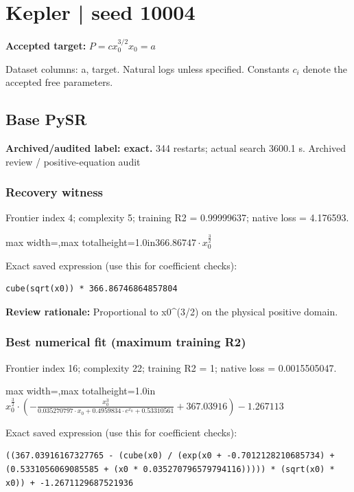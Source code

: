 \documentclass[10pt,letterpaper,landscape]{article}
\begin{document}
\section*{Kepler | seed 10004}
\textbf{Accepted target:} $\displaystyle P=c x_0^{3/2}$\hfill $x_0=a$\par
{\small Dataset columns: a, target. Natural logs unless specified. Constants $c_i$ denote the accepted free parameters.}\par\medskip
\begin{minipage}[t]{0.485\textwidth}
\subsection*{Base PySR}
\textbf{Archived/audited label: exact.} 344 restarts; actual search 3600.1 s.
{\small Archived review / positive-equation audit}
\subsubsection*{Recovery witness}
Frontier index 4; complexity 5; training R2 = 0.99999637; native loss = 4.176593.
\begin{center}\begin{adjustbox}{max width=\linewidth,max totalheight=1.0in}$\displaystyle 366.86747 \cdot x_{0}^{\frac{3}{2}}$\end{adjustbox}\end{center}
{\scriptsize Exact saved expression (use this for coefficient checks):}
\begin{lstlisting}
cube(sqrt(x0)) * 366.86746864857804
\end{lstlisting}
{\small\textbf{Review rationale:} Proportional to x0\textasciicircum{}(3/2) on the physical positive domain.}
\subsubsection*{Best numerical fit (maximum training R2)}
Frontier index 16; complexity 22; training R2 = 1; native loss = 0.0015505047.
\begin{center}\begin{adjustbox}{max width=\linewidth,max totalheight=1.0in}$\displaystyle x_{0}^{\frac{3}{2}} \cdot \left(- \frac{x_{0}^{3}}{0.035270797 \cdot x_{0} + 0.4959834 \cdot e^{x_{0}} + 0.53310561} + 367.03916\right) - 1.267113$\end{adjustbox}\end{center}
{\scriptsize Exact saved expression (use this for coefficient checks):}
\begin{lstlisting}
((367.03916167327765 - (cube(x0) / (exp(x0 + -0.7012128210685734) + (0.5331056069085585 + (x0 * 0.035270796579794116))))) * (sqrt(x0) * x0)) + -1.2671129687521936
\end{lstlisting}
\end{minipage}\hfill
\end{document}
